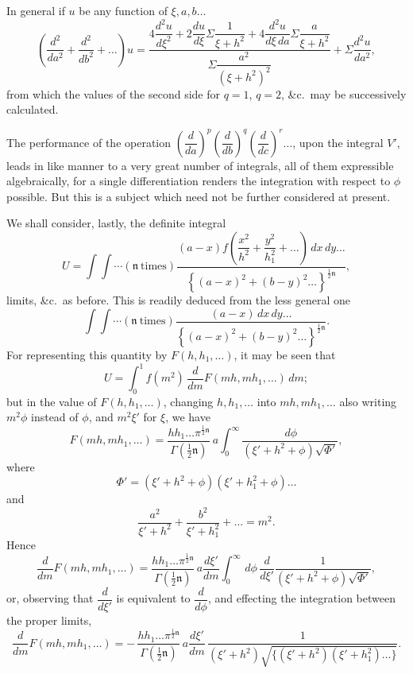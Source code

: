 \documentclass[11pt]{article}
\providecommand{\dd}{\,d}
\providecommand{\n}{\mathfrak{n}}
\begin{document}
\clearpage

\noindent In general if $u$ be any function of $\xi,a,b\ldots$
\[
\left(\frac{d^{2}}{da^{2}}+\frac{d^{2}}{db^{2}}+\ldots\right)u
=
\frac{
4\dfrac{d^{2}u}{d\xi^{2}}
+2\dfrac{du}{d\xi}\Sigma\dfrac{1}{\xi+h^{2}}
+4\dfrac{d^{2}u}{d\xi\,da}\Sigma\dfrac{a}{\xi+h^{2}}
}
{\Sigma\dfrac{a^{2}}{(\xi+h^{2})^{2}}}
+\Sigma\frac{d^{2}u}{da^{2}},
\]
from which the values of the second side for $q=1$, $q=2$, \&c.\ may be successively
calculated.

The performance of the operation
$\left(\dfrac{d}{da}\right)^{p}\left(\dfrac{d}{db}\right)^{q}
\left(\dfrac{d}{dc}\right)^{r}\ldots$, upon the integral $V'$, leads in like manner to a very
great number of integrals, all of them expressible algebraically, for a single differentiation
renders the integration with respect to $\phi$ possible. But this is a subject which need not
be further considered at present.

We shall consider, lastly, the definite integral
\[
U=\int\!\!\int\cdots(\n\ \text{times})
\frac{(a-x)f\left(\dfrac{x^{2}}{h^{2}}+\dfrac{y^{2}}{h_{1}^{2}}+\ldots\right)\dd x\dd y\ldots}
{\left\{(a-x)^{2}+(b-y)^{2}\ldots\right\}^{\frac12\n}},
\]
limits, \&c.\ as before. This is readily deduced from the less general one
\[
\int\!\!\int\cdots(\n\ \text{times})
\frac{(a-x)\dd x\dd y\ldots}
{\left\{(a-x)^{2}+(b-y)^{2}\ldots\right\}^{\frac12\n}}.
\]
For representing this quantity by $F(h,h_{1},\ldots)$, it may be seen that
\[
U=\int_{0}^{1}f(m^{2})\,\frac{d}{dm}F(mh,mh_{1},\ldots)\dd m;
\]
but in the value of $F(h,h_{1},\ldots)$, changing $h,h_{1},\ldots$ into $mh,mh_{1},\ldots$
also writing $m^{2}\phi$ instead of $\phi$, and $m^{2}\xi'$ for $\xi$, we have
\[
F(mh,mh_{1},\ldots)=
\frac{hh_{1}\ldots\pi^{\frac12\n}}{\Gamma(\frac12\n)}\,a
\int_{0}^{\infty}
\frac{\dd\phi}{(\xi'+h^{2}+\phi)\sqrt{\Phi'}},
\]
where
\[
\Phi'=(\xi'+h^{2}+\phi)(\xi'+h_{1}^{2}+\phi)\ldots
\]
and
\[
\frac{a^{2}}{\xi'+h^{2}}+\frac{b^{2}}{\xi'+h_{1}^{2}}+\ldots=m^{2}.
\]
Hence
\[
\frac{d}{dm}F(mh,mh_{1},\ldots)
=
\frac{hh_{1}\ldots\pi^{\frac12\n}}{\Gamma(\frac12\n)}\,a
\frac{d\xi'}{dm}
\int_{0}^{\infty}\dd\phi\,
\frac{d}{d\xi'}
\frac{1}{(\xi'+h^{2}+\phi)\sqrt{\Phi'}},
\]
or, observing that $\dfrac{d}{d\xi'}$ is equivalent to $\dfrac{d}{d\phi}$, and effecting the
integration between the proper limits,
\[
\frac{d}{dm}F(mh,mh_{1},\ldots)
=-\,\frac{hh_{1}\ldots\pi^{\frac12\n}}{\Gamma(\frac12\n)}\,a
\frac{d\xi'}{dm}\,
\frac{1}{(\xi'+h^{2})\sqrt{\{(\xi'+h^{2})(\xi'+h_{1}^{2})\ldots\}}}.
\]

\clearpage
\end{document}
